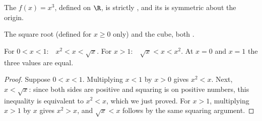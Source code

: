 \begin{proposition}\label{prop:g10:reffunc:cube}
The  $f(x) = x^3$, defined on $\R$, is strictly , and
its  is symmetric about the origin.
\end{proposition}
\admitted

\begin{omfigure}
\hfill
{}

{\small The square root (defined for $x \geq 0$ only) and the cube, both
.}
\end{omfigure}

\begin{proposition}\label{prop:g10:reffunc:compare}
For $0 < x < 1$:\ \ $x^2 < x < \sqrt x$.\quad
For $x > 1$:\ \ $\sqrt x < x < x^2$.\quad
At $x = 0$ and $x = 1$ the three values are equal.
\end{proposition}

\begin{proof}
Suppose $0 < x < 1$. Multiplying $x < 1$ by $x > 0$ gives $x^2 < x$.
Next, $x < \sqrt x$: since both sides are positive and squaring is
 on positive numbers, this inequality is equivalent to
$x^2 < x$, which we just proved. For $x > 1$, multiplying $x > 1$ by $x$
gives $x^2 > x$, and $\sqrt x < x$ follows by the same squaring argument.
\end{proof}

